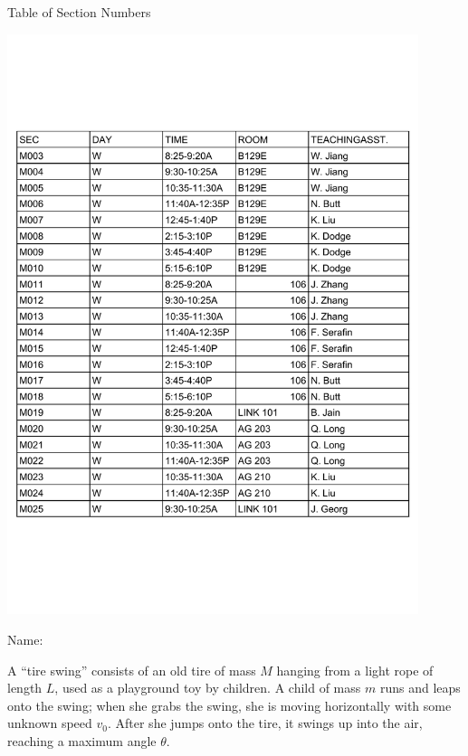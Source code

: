 \documentclass[12pt]{article}
\begin{document}
\centerline{\sc \Large Table of Section Numbers}
\centerline{\includegraphics[width=0.9\textwidth]{sections.pdf}}

\newpage
\small





\begin{flushright}
    Name: \underline{\hspace{3in}}
    \end{flushright}
  
    \Large \centerline{}
    \normalsize

  \rm

  A ``tire swing'' consists of an old tire of mass $M$ hanging from a light rope of length $L$, used as a playground toy by children. A child of mass $m$ runs and leaps onto the swing; when she 
  grabs the swing, she is moving horizontally with some unknown speed $v_0$. After she jumps onto the tire, it swings up into the air, reaching a maximum angle $\theta$.
\end{document}
